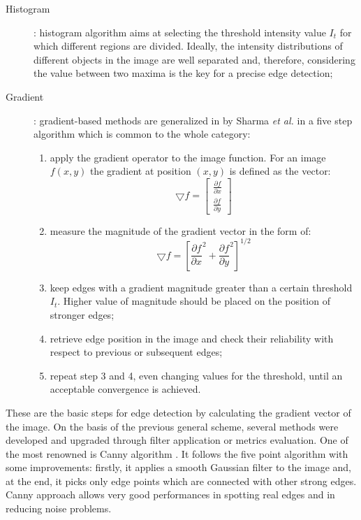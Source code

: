 \documentclass[../main.tex]{subfiles}
\begin{document}
\begin{description}
\item[Histogram] : histogram algorithm aims at selecting the threshold intensity value $I_{t}$ for which different regions are divided. Ideally, the intensity distributions of different objects in the image are well separated and, therefore, considering the value between two maxima is the key for a precise edge detection; 
\item[Gradient] : gradient-based methods are generalized in \cite{automated_segm_tech} by Sharma \textit{et al.} in a five step algorithm which is common to the whole category:
          \begin{enumerate}
               \item apply the gradient operator to the image function.
               For an image $f(x,y)$ the gradient at position $(x,y)$ is defined as the vector:
               \begin{equation}
               \bigtriangledown f = \begin{bmatrix}
                                            \frac{\partial f}{\partial x} \\
                                            \frac{\partial f}{\partial y}
                                        \end{bmatrix}
               \end{equation}
               \item measure the magnitude of the gradient vector in the form of:
               \begin{equation}
                     \bigtriangledown f = \left[ \frac{\partial f}{\partial x}^{2} + \frac{\partial f}{\partial y}^{2} \right]^{1/2}
               \end{equation}
               \item keep edges with a gradient magnitude greater than a certain threshold $I_{t}$. 
               Higher value of magnitude should be placed on the position of stronger edges;
               \item retrieve edge position in the image and check their reliability with respect to previous or subsequent edges;
               \item repeat step 3 and 4, even changing values for the threshold, until an acceptable convergence is achieved.
           \end{enumerate}
\end{description}
These are the basic steps for edge detection by calculating the gradient vector of the image. 
On the basis of the previous general scheme, several methods were developed and upgraded through filter application or metrics evaluation.
One of the most renowned is Canny algorithm \cite{Canny}. 
It follows the five point algorithm with some improvements: firstly, it applies a  smooth Gaussian filter to the image and, at the end, it picks only edge points which are connected with other strong edges. 
Canny approach allows very good performances in spotting real edges and in reducing noise problems\cite{saif2016gradient}.
\end{document}
